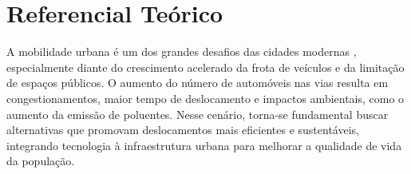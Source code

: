 
\chapter{Referencial Teórico}
\label{cap:referencial}

A mobilidade urbana é um dos grandes desafios das cidades modernas \cite{roche2012}, especialmente diante do crescimento acelerado da frota de veículos e da limitação de espaços públicos. O aumento do número de automóveis nas vias resulta em congestionamentos, maior tempo de deslocamento e impactos ambientais, como o aumento da emissão de poluentes. Nesse cenário, torna-se fundamental buscar alternativas que promovam deslocamentos mais eficientes e sustentáveis, integrando tecnologia à infraestrutura urbana para melhorar a qualidade de vida da população.


